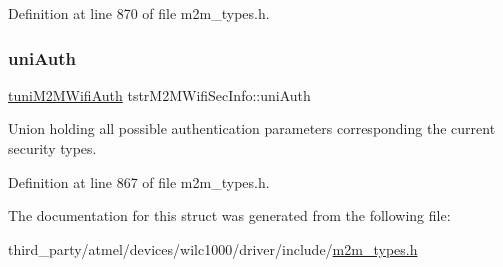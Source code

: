 Definition at line 870 of file m2m\+\_\+types.\+h.

\mbox{\label{structtstrM2MWifiSecInfo_abdd40dd09a9db1ae2952ab8de06d3274}} 
\subsubsection{\texorpdfstring{uni\+Auth}{uniAuth}}
{\footnotesize\ttfamily \hyperlink{uniontuniM2MWifiAuth}{tuni\+M2\+M\+Wifi\+Auth} tstr\+M2\+M\+Wifi\+Sec\+Info\+::uni\+Auth}

Union holding all possible authentication parameters corresponding the current security types. 

Definition at line 867 of file m2m\+\_\+types.\+h.



The documentation for this struct was generated from the following file\+:\begin{DoxyCompactItemize}
\item 
third\+\_\+party/atmel/devices/wilc1000/driver/include/\hyperlink{m2m__types_8h}{m2m\+\_\+types.\+h}\end{DoxyCompactItemize}
